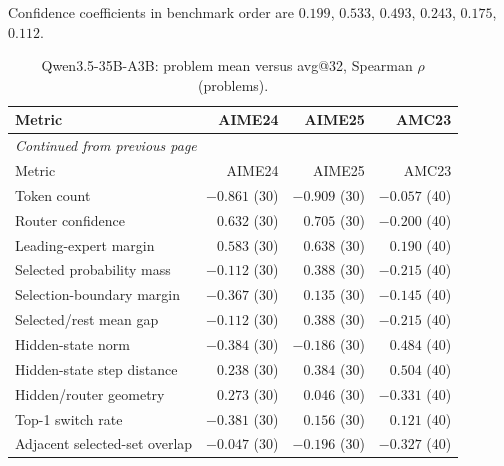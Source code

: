 Confidence coefficients in benchmark order are $0.199$, $0.533$, $0.493$, $0.243$, $0.175$, $0.112$.
\begingroup\scriptsize\setlength{\tabcolsep}{4pt}
\begin{longtable}{@{}lrrr@{}}
\caption{Qwen3.5-35B-A3B: problem mean versus avg@32, Spearman $\rho$ (problems).}\label{tab:multi-repeated-qwen}\\
\toprule
Metric & AIME24 & AIME25 & AMC23 \\
\midrule\endfirsthead
\multicolumn{4}{l}{\textit{Continued from previous page}}\\
\toprule
Metric & AIME24 & AIME25 & AMC23 \\
\midrule\endhead
\bottomrule\endfoot
Token count & $-0.861$ (30) & $-0.909$ (30) & $-0.057$ (40) \\
Router confidence & $0.632$ (30) & $0.705$ (30) & $-0.200$ (40) \\
Leading-expert margin & $0.583$ (30) & $0.638$ (30) & $0.190$ (40) \\
Selected probability mass & $-0.112$ (30) & $0.388$ (30) & $-0.215$ (40) \\
Selection-boundary margin & $-0.367$ (30) & $0.135$ (30) & $-0.145$ (40) \\
Selected/rest mean gap & $-0.112$ (30) & $0.388$ (30) & $-0.215$ (40) \\
Hidden-state norm & $-0.384$ (30) & $-0.186$ (30) & $0.484$ (40) \\
Hidden-state step distance & $0.238$ (30) & $0.384$ (30) & $0.504$ (40) \\
Hidden/router geometry & $0.273$ (30) & $0.046$ (30) & $-0.331$ (40) \\
Top-1 switch rate & $-0.381$ (30) & $0.156$ (30) & $0.121$ (40) \\
Adjacent selected-set overlap & $-0.047$ (30) & $-0.196$ (30) & $-0.327$ (40) \\
\end{longtable}\endgroup

